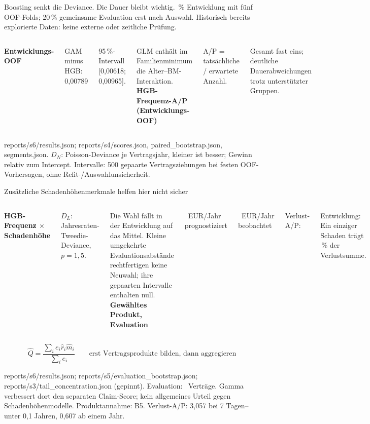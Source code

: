 \documentclass[aspectratio=169,11pt]{beamer}
\newcommand{\source}[1]{\vfill{\fontsize{6.5}{7.4}\selectfont\color{muted}#1\par}}
\newcommand{\smalltext}{\fontsize{9}{11.3}\selectfont}
\begin{document}
\begin{frame}[t]{Boosting senkt die Deviance. Die Dauer bleibt wichtig.}
\smalltext 80\,\% Entwicklung mit fünf OOF-Folds; 20\,\% gemeinsame Evaluation erst nach Auswahl.
Historisch bereits explorierte Daten: keine externe oder zeitliche Prüfung.\par\medskip
\begin{columns}[T,onlytextwidth]
\textbf{Entwicklungs-OOF}\par\medskip
{\small\FrequencyTable}\par\medskip
\smalltext GAM minus HGB: 0,00789\par
95\,\%-Intervall [0,00618; 0,00965].\par
GLM enthält im Familienminimum die Alter--BM-Interaktion.
\textbf{HGB-Frequenz-A/P (Entwicklungs-OOF)}\par\medskip
{\small\FrequencyDuration}\par\medskip
\smalltext A/P = tatsächliche / erwartete Anzahl.\par
Gesamt fast eins; deutliche Dauerabweichungen trotz unterstützter Gruppen.
\end{columns}
\source{reports/s6/results.json; reports/s4/scores.json, paired\_bootstrap.json, segments.json.
$D_N$: Poisson-Deviance je Vertragsjahr, kleiner ist besser; Gewinn relativ zum Intercept.
Intervalle: 500 gepaarte Vertragsziehungen bei festen OOF-Vorhersagen, ohne Refit-/Auswahlunsicherheit.}
\end{frame}

\begin{frame}[t]{Zusätzliche Schadenhöhenmerkmale helfen hier nicht sicher}
\begin{columns}[T,onlytextwidth]
\textbf{HGB-Frequenz $\times$ Schadenhöhe}\par\medskip
{\small\LossTable}\par\medskip
\smalltext $D_L$: Jahresraten-Tweedie-Deviance, $p=1{,}5$.\par
Die Wahl fällt in der Entwicklung auf das Mittel.
Kleine umgekehrte Evaluationsabstände rechtfertigen keine Neuwahl;
ihre gepaarten Intervalle enthalten null.
\textbf{Gewähltes Produkt, Evaluation}\par\medskip
\EvalPredicted\ EUR/Jahr prognostiziert\par
\EvalObserved\ EUR/Jahr beobachtet\par
\medskip
Verlust-A/P: \EvalAP\par\medskip
\smalltext Entwicklung: Ein einziger Schaden trägt \LargestShare\,\% der Verlustsumme.
\end{columns}
\medskip
\[
\widehat Q=\frac{\sum_i e_i\widehat r_i\widehat m_i}{\sum_i e_i}
\qquad\text{erst Vertragsprodukte bilden, dann aggregieren}
\]
\source{reports/s6/results.json; reports/s5/evaluation\_bootstrap.json; reports/s3/tail\_concentration.json (gepinnt).
Evaluation: \EvalPolicies\ Verträge. Gamma verbessert dort den separaten Claim-Score;
kein allgemeines Urteil gegen Schadenhöhenmodelle. Produktannahme: B5.
Verlust-A/P: 3,057 bei 7 Tagen--unter 0,1 Jahren, 0,607 ab einem Jahr.}
\end{frame}
\end{document}
